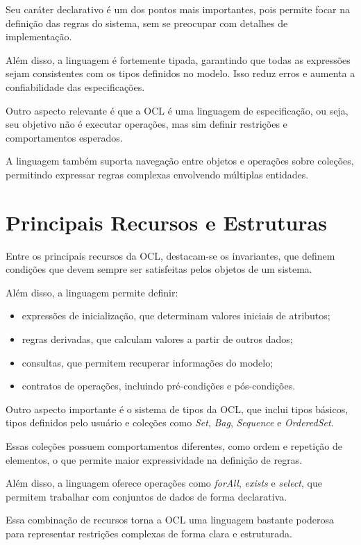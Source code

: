 \documentclass[conference]{IEEEtran}
\begin{document}
Seu caráter declarativo é um dos pontos mais importantes, pois permite focar na definição das regras do sistema, sem se preocupar com detalhes de implementação.

Além disso, a linguagem é fortemente tipada, garantindo que todas as expressões sejam consistentes com os tipos definidos no modelo. Isso reduz erros e aumenta a confiabilidade das especificações.

Outro aspecto relevante é que a OCL é uma linguagem de especificação, ou seja, seu objetivo não é executar operações, mas sim definir restrições e comportamentos esperados.

A linguagem também suporta navegação entre objetos e operações sobre coleções, permitindo expressar regras complexas envolvendo múltiplas entidades.

\section{Principais Recursos e Estruturas}

Entre os principais recursos da OCL, destacam-se os invariantes, que definem condições que devem sempre ser satisfeitas pelos objetos de um sistema.

Além disso, a linguagem permite definir:
\begin{itemize}
\item expressões de inicialização, que determinam valores iniciais de atributos;
\item regras derivadas, que calculam valores a partir de outros dados;
\item consultas, que permitem recuperar informações do modelo;
\item contratos de operações, incluindo pré-condições e pós-condições.
\end{itemize}

Outro aspecto importante é o sistema de tipos da OCL, que inclui tipos básicos, tipos definidos pelo usuário e coleções como \textit{Set}, \textit{Bag}, \textit{Sequence} e \textit{OrderedSet}.

Essas coleções possuem comportamentos diferentes, como ordem e repetição de elementos, o que permite maior expressividade na definição de regras.

Além disso, a linguagem oferece operações como \textit{forAll}, \textit{exists} e \textit{select}, que permitem trabalhar com conjuntos de dados de forma declarativa.

Essa combinação de recursos torna a OCL uma linguagem bastante poderosa para representar restrições complexas de forma clara e estruturada.
\end{document}
